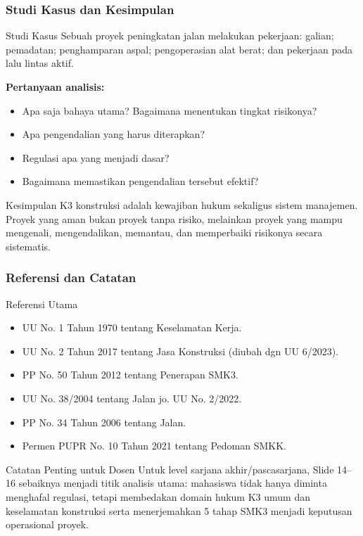 \documentclass[../main.tex]{subfiles}
\begin{document}
\begin{frame}[mytitle=standard,t,mycolor=digiPH_creamy!15]
	\frametitle{Studi Kasus dan Kesimpulan}

	\begin{block}{Studi Kasus}
		Sebuah proyek peningkatan jalan melakukan pekerjaan: galian; pemadatan; penghamparan aspal; pengoperasian alat berat; dan pekerjaan pada lalu lintas aktif.

		\textbf{Pertanyaan analisis:}
		\begin{itemize}
			\item Apa saja bahaya utama? Bagaimana menentukan tingkat risikonya?
			\item Apa pengendalian yang harus diterapkan?
			\item Regulasi apa yang menjadi dasar?
			\item Bagaimana memastikan pengendalian tersebut efektif?
		\end{itemize}
	\end{block}

	\begin{exampleblock}{Kesimpulan}
		K3 konstruksi adalah kewajiban hukum sekaligus sistem manajemen. Proyek yang aman bukan proyek tanpa risiko, melainkan proyek yang mampu mengenali, mengendalikan, memantau, dan memperbaiki risikonya secara sistematis.
	\end{exampleblock}
\end{frame}

\begin{frame}[mytitle=standard,t,mycolor=white]
	\frametitle{Referensi dan Catatan}

	\begin{block}{Referensi Utama}
		\begin{itemize}
			\item UU No. 1 Tahun 1970 tentang Keselamatan Kerja.
			\item UU No. 2 Tahun 2017 tentang Jasa Konstruksi (diubah dgn UU 6/2023).
			\item PP No. 50 Tahun 2012 tentang Penerapan SMK3.
			\item UU No. 38/2004 tentang Jalan jo. UU No. 2/2022.
			\item PP No. 34 Tahun 2006 tentang Jalan.
			\item Permen PUPR No. 10 Tahun 2021 tentang Pedoman SMKK.
		\end{itemize}
	\end{block}

	\begin{alertblock}{Catatan Penting untuk Dosen}
		Untuk level sarjana akhir/pascasarjana, Slide 14–16 sebaiknya menjadi titik analisis utama: mahasiswa tidak hanya diminta menghafal regulasi, tetapi membedakan domain hukum K3 umum dan keselamatan konstruksi serta menerjemahkan 5 tahap SMK3 menjadi keputusan operasional proyek.
	\end{alertblock}
\end{frame}
\end{document}
